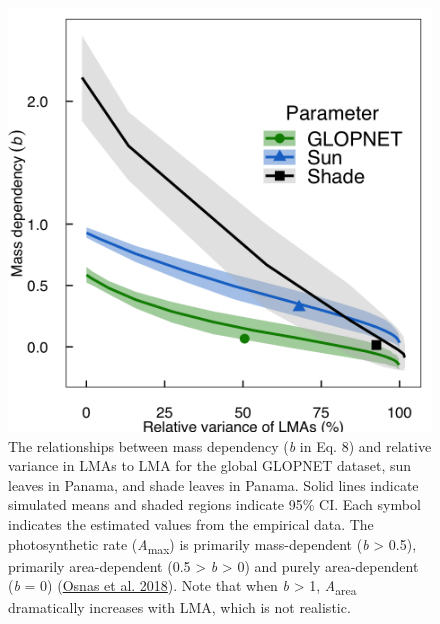 \documentclass[
  12pt,
]{article}
\providecommand{\DIFaddbeginFL}{} %
\providecommand{\DIFaddendFL}{} %
\providecommand{\DIFdelbeginFL}{} %
\providecommand{\DIFdelendFL}{} %
\newcommand{\DIFscaledelfig}{0.5}
\newlength{\DIFdelgraphicswidth} %
\newlength{\DIFdelgraphicsheight} %
\newcommand{\DIFaddincludegraphics}[2][]{{\color{blue}\fbox{\DIFOincludegraphics[#1]{#2}}}} %
\newcommand{\DIFdelincludegraphics}[2][]{%
\sbox{\DIFdelgraphicsbox}{\DIFOincludegraphics[#1]{#2}}%
\settoboxwidth{\DIFdelgraphicswidth}{\DIFdelgraphicsbox} %
\settoboxtotalheight{\DIFdelgraphicsheight}{\DIFdelgraphicsbox} %
\scalebox{\DIFscaledelfig}{%
\parbox[b]{\DIFdelgraphicswidth}{\usebox{\DIFdelgraphicsbox}\\[-\baselineskip] \rule{\DIFdelgraphicswidth}{0em}}\llap{\resizebox{\DIFdelgraphicswidth}{\DIFdelgraphicsheight}{%
\setlength{\unitlength}{\DIFdelgraphicswidth}%
\begin{picture}(1,1)%
\thicklines\linethickness{2pt} %
{\color[rgb]{1,0,0}\put(0,0){\framebox(1,1){}}}%
{\color[rgb]{1,0,0}\put(0,0){\line( 1,1){1}}}%
{\color[rgb]{1,0,0}\put(0,1){\line(1,-1){1}}}%
\end{picture}%
}\hspace*{3pt}}} %
} %
\DeclareRobustCommand{\DIFaddbeginFL}{\DIFOaddbeginFL \let\includegraphics\DIFaddincludegraphics} %
\DeclareRobustCommand{\DIFaddendFL}{\DIFOaddendFL \let\includegraphics\DIFOincludegraphics} %
\DeclareRobustCommand{\DIFdelbeginFL}{\DIFOdelbeginFL \let\includegraphics\DIFdelincludegraphics} %
\DeclareRobustCommand{\DIFdelendFL}{\DIFOaddendFL \let\includegraphics\DIFOincludegraphics} %
\begin{document}
\begin{figure}
\DIFdelbeginFL %
\DIFdelendFL \DIFaddbeginFL \hypertarget{fig:massplt}{%
\centering
\includegraphics{../figs/mass_prop_simple.png}
\caption{The relationships between mass dependency (\emph{b} in Eq. 8) and relative variance in LMAs to LMA for the global GLOPNET dataset, sun leaves in Panama, and shade leaves in Panama.
Solid lines indicate simulated means and shaded regions indicate 95\% CI.
Each symbol indicates the estimated values from the empirical data.
The photosynthetic rate (\emph{A}\textsubscript{max}) is primarily mass-dependent (\emph{b} \textgreater{} 0.5), primarily area-dependent (0.5 \textgreater{} \emph{b} \textgreater{} 0) and purely area-dependent (\emph{b} = 0) (\protect\hyperlink{ref-Osnas2018}{Osnas et al. 2018}).
Note that when \emph{b} \textgreater{} 1, \emph{A}\textsubscript{area} dramatically increases with LMA, which is not realistic.}\label{fig:massplt}
}
\DIFaddendFL \end{figure}
\end{document}

